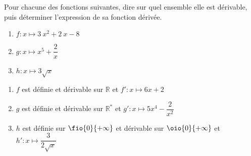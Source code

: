 \documentclass[a4paper,11pt,exos]{nsi} %
\begin{document}

\maketitle

\begin{exercice}
    Pour chacune des fonctions suivantes, dire sur quel ensemble elle est dérivable, puis déterminer l'expression de sa fonction dérivée.
    \begin{multicols}{3}
        \begin{enumerate}
            \item $f:x\longmapsto 3~{ x}^{2}+2~ x-8$
        
            \item $g:x\longmapsto { x}^{5}+\dfrac{2}{ x}$
            \item $h:x\longmapsto 3\sqrt{ x}$
        \end{enumerate}
    \end{multicols}
    
\end{exercice}

\begin{enumerate}[itemsep=1em]
    \item $f$ est définie et dérivable sur $\mathbb{R}$ et $ f':x\longmapsto 6 x+2$
    \item $g$ est définie et dérivable sur $\mathbb{R}^{\text{*}}$ et $ g':x\longmapsto 5x^4-\dfrac{2}{x^2}$
    
    \item $h$ est définie sur $\fio{0}{+\infty}$ et dérivable sur $\oio{0}{+\infty}$ et $ h':x\longmapsto \dfrac{3}{2\sqrt{ x}}$
    \end{enumerate}
\end{document}
